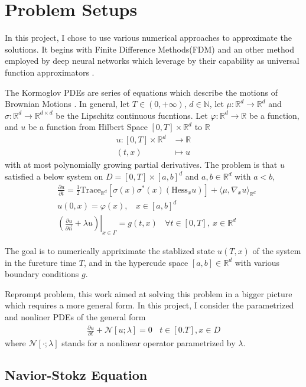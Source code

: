 \section{Problem Setups}
In this project, I chose to use various numerical approaches to approximate the solutions.
It begins with Finite Difference Methods(FDM) and an other method employed by deep neural 
networks which leverage by their capability as universal function approximators
\cite{DNN-HORNIK1989359}. 

The Kormoglov PDEs are series of equations which describe the motions of Brownian Motions
\cite{SolveKorPDE}.
In general, 
let $T \in (0, +\infty)$, $d \in \mathbb{N}$, 
let $\mu : \mathbb{R}^d \rightarrow \mathbb{R}^d$ 
and $\sigma: \mathbb{R}^d \rightarrow \mathbb{R}^{d \times d}$ be the Lipschitz continuous fucntions.
Let $\varphi : \mathbb{R}^d \rightarrow \mathbb{R}$ be a function, 
and $u$ be a function from Hilbert Space 
$[0, T] \times \mathbb{R}^d$ to $\mathbb{R}$
\begin{align*}
  u : [0, T] \times \mathbb{R}^d & \longrightarrow \mathbb{R} \\
      (t, x) & \longmapsto u 
\end{align*}
with at most polynomially growing partial derivatives.
The problem is that $u$ satisfied a below system on $D = [0, T] \times \left[a, b \right]^d $ and 
$a, b \in \mathbb{R}^d$ with $a < b$,
\begin{align}
  & \frac{\partial u}{
    \partial t} 
  = \frac{1}{2}
  \text{Trace}_{\mathbb{R}^d}
  \left[
    \sigma(x) \sigma^{*}(x)
    \left(\text{Hess}_x u\right)
  \right]
  +
  \langle 
    \mu, 
    \nabla _x u
  \rangle_{
    \mathbb{R}^d
  } \\
 & u(0, x) = \varphi(x), 
 \:\:\:\: 
 x \in \left[a, b \right]^d
 \\
 & \left.
 \left(
  \frac{\partial u}{\partial \vec{n}}  + \lambda u 
 \right)
 \right|_{x \in \varGamma}
 = g(t, x) 
 \:\:\:\: 
 \forall t \in [0, T],\: x \in \mathbb{R}^d
\end{align}

The goal is to numerically appriximate the stablized state $u(T, x)$ of the system in the fureture time $T$,
and in the hypercude space $\left[a, b\right]\in \mathbb{R}^d$ with various boundary conditions $g$.

Reprompt problem, this work aimed at solving this problem in a bigger picture which requires a more general 
form. 
In this project, I consider the parametrized and nonliner PDEs of the general form
\begin{align}
  \frac{\partial u}{\partial t}
  + \mathcal{N} 
  \left[
    u; \lambda
  \right] 
  = 0
  \:\:\:\: 
  t \in \left[0. T\right], x \in D
\end{align}
where $\mathcal{N}\left[\cdot; \lambda \right]$ stands for a nonlinear operator parametrized by $\lambda$.

\subsection{Navior-Stokz Equation}